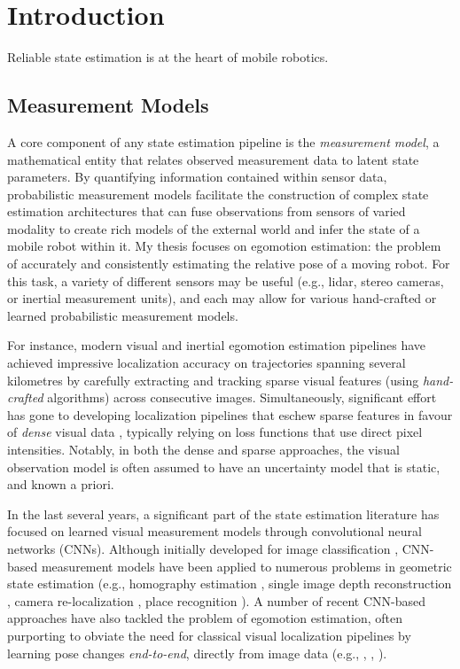 \chapter{Introduction}
Reliable state estimation is at the heart of mobile robotics.

\section{Measurement Models}
A core component of any state estimation pipeline is the \textit{measurement model}, a mathematical entity that relates  observed measurement data to latent state parameters. By quantifying information contained within sensor data, probabilistic measurement models facilitate the construction of complex state estimation architectures that can fuse observations from sensors of varied modality to create rich models of the external world and infer the state of a mobile robot within it. My thesis focuses on egomotion estimation: the problem of accurately and consistently estimating the relative pose of a moving robot. For this task, a variety of different sensors may be useful (e.g., lidar, stereo cameras, or inertial measurement units), and each may allow for various hand-crafted or learned probabilistic measurement models.

For instance, modern visual and inertial egomotion estimation pipelines \citep{Leutenegger2015-fk, Cvisic2015-mt, Tsotsos2015-qs} have achieved impressive localization accuracy on trajectories spanning several kilometres by carefully extracting and tracking sparse visual features (using \textit{hand-crafted} algorithms) across consecutive images. Simultaneously, significant effort has gone to developing localization pipelines that eschew sparse features in favour of  \textit{dense} visual data \citep{Alcantarilla2016-kv, Forster2014-bm}, typically relying on loss functions that use direct pixel intensities. Notably, in both the dense and sparse approaches, the visual observation model is often assumed to have an uncertainty model that is static, and known a priori. %

In the last several years, a significant part of the state estimation literature has focused on learned visual measurement models through convolutional neural networks (CNNs). Although initially developed for image classification  \citep{LeCun2015-qf}, CNN-based measurement models have been applied to numerous problems in geometric state estimation (e.g., homography estimation \citep{DeTone2016-ue}, single image depth reconstruction \citep{Garg2016-ip},  camera re-localization \citep{Kendall2016-zf}, place recognition \citep{Sunderhauf2015-is}). A number of recent CNN-based approaches have also tackled the problem of egomotion estimation, often purporting to obviate the need for classical visual localization pipelines by learning pose changes \textit{end-to-end}, directly from image data (e.g., \cite{Melekhov2017-dl}, \cite{Handa2016-hm}, \cite{Oliveira2017-lt}).

